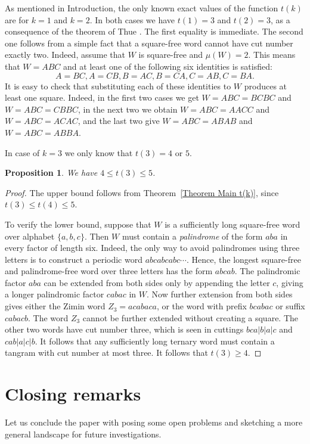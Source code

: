 \documentclass[12pt]{amsart}
\theoremstyle{plain}
\newtheorem{proposition}{Proposition}
\numberwithin{equation}{section}
\begin{document}
As mentioned in Introduction, the only known exact values of the function $t(k)$ are for $k=1$ and $k=2$. In both cases we have $t(1)=3$ and $t(2)=3$, as a consequence of the theorem of Thue \cite{Thue}. The first equality is immediate. The second one follows from a simple fact that a square-free word cannot have cut number exactly two. Indeed, assume that $W$ is square-free and $\mu(W)=2$. This means that $W=ABC$ and at least one of the following six identities is satisfied: $$A=BC,A=CB,B=AC,B=CA,C=AB,C=BA.$$It is easy to check that substituting each of these identities to $W$ produces at least one square. Indeed, in the first two cases we get $W=ABC=BCBC$ and $W=ABC=CBBC$, in the next two we obtain $W=ABC=AACC$ and $W=ABC=ACAC$, and the last two give $W=ABC=ABAB$ and $W=ABC=ABBA$.

In case of $k=3$ we only know that $t(3)=4$ or $5$.

\begin{proposition}\label{Proposition t(3)}
	We have $4\leqslant t(3)\leqslant 5$.
\end{proposition}
\begin{proof}
	The upper bound follows from Theorem~\ref{Theorem Main t(k)}, since $t(3)\leqslant t(4)\leqslant 5$. 
	
	To verify the lower bound, suppose that $W$ is a sufficiently long square-free word over alphabet $\{a,b,c\}$. Then $W$ must contain a \emph{palindrome} of the form $aba$ in every factor of length six. Indeed, the only way to avoid palindromes using three letters is to construct a periodic word $abcabcabc\cdots$. Hence, the longest square-free and palindrome-free word over three letters has the form $abcab$. The palindromic factor $aba$ can be extended from both sides only by appending the letter $c$, giving a longer palindromic factor $cabac$ in $W$. Now further extension from both sides gives either the Zimin word $Z_3=acabaca$, or the word with prefix $bcabac$ or suffix $cabacb$. The word $Z_3$ cannot be further extended without creating a square. The other two words have cut number three, which is seen in cuttings $bca|b|a|c$ and $cab|a|c|b$. It follows that any sufficiently long ternary word must contain a tangram with cut number at most three. It follows that $t(3)\geqslant 4$.
\end{proof}

\section{Closing remarks}
Let us conclude the paper with posing some open problems and sketching a more general landscape for future investigations.
\end{document}
